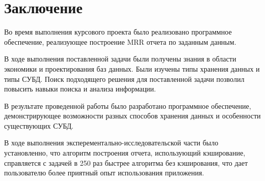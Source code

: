 \chapter*{Заключение}

Во время выполнения курсового проекта было реализовано программное обеспечение, реализующее построение MRR отчета по заданным данным.

В ходе выполнения поставленной задачи были получены знания в области экономики и проектирования баз данных. Были изучены типы хранения данных и типы СУБД. Поиск подходящего решения для поставленной задачи позволил повысить навыки поиска и анализа информации.

В результате проведенной работы было разработано программное обеспечение, демонстрирующее возможности разных способов хранения данных и особенности существующих СУБД.

В ходе выполнения эксперементально-исследовательской части было установленно, что алгоритм построения отчета, использующий кэширование, справляется с задачей в 250 раз быстрее алгоритма без кэширования, что дает пользователю более приятный опыт использования приложения.
